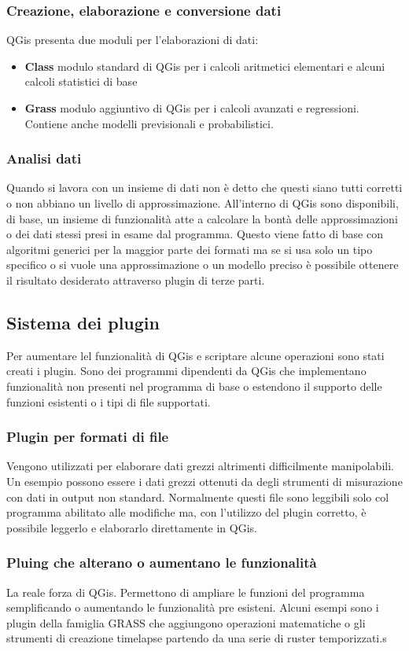 \subsubsection{Creazione, elaborazione e conversione dati}
QGis presenta due moduli per l'elaborazioni di dati:
\begin{itemize}
	\item \textbf{Class} modulo standard di QGis per i calcoli aritmetici elementari e alcuni calcoli statistici di base
	\item \textbf{Grass} modulo aggiuntivo di QGis per i calcoli avanzati e regressioni. Contiene anche modelli previsionali e probabilistici.
\end{itemize}

\subsubsection{Analisi dati}
Quando si lavora con un insieme di dati non è detto che questi siano tutti corretti o non abbiano un livello di approssimazione.
All'interno di QGis sono disponibili, di base, un insieme di funzionalità atte a calcolare la bontà delle approssimazioni o dei dati stessi presi in esame dal programma.
Questo viene fatto di base con algoritmi generici per la maggior parte dei formati ma se si usa solo un tipo specifico o si vuole una approssimazione o un modello preciso è possibile ottenere il risultato desiderato attraverso plugin di terze parti.

\subsection{Sistema dei plugin}
Per aumentare lel funzionalità di QGis e scriptare alcune operazioni sono stati creati i plugin.
Sono dei programmi dipendenti da QGis che implementano funzionalità non presenti nel programma di base o estendono il supporto delle funzioni esistenti o i tipi di file supportati.

\subsubsection{Plugin per formati di file}
Vengono utilizzati per elaborare dati grezzi altrimenti difficilmente manipolabili.
Un esempio possono essere i dati grezzi ottenuti da degli strumenti di misurazione con dati in output non standard.
Normalmente questi file sono leggibili solo col programma abilitato alle modifiche ma, con l'utilizzo del plugin corretto, è possibile leggerlo e elaborarlo direttamente in QGis.

\subsubsection{Pluing che alterano o aumentano le funzionalità}
La reale forza di QGis. Permettono di ampliare le funzioni del programma semplificando o aumentando le funzionalità pre esisteni. Alcuni esempi sono i plugin della famiglia GRASS che aggiungono operazioni matematiche o gli strumenti di creazione timelapse partendo da una serie di ruster temporizzati.s
